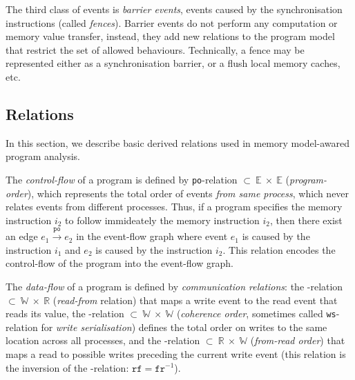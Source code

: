 The third class of events is \textit{barrier events}, events caused by the synchronisation instructions (called \textit{fences}). Barrier events do not perform any computation or memory value transfer, instead, they add new relations to the program model that restrict the set of allowed behaviours. Technically, a fence may be represented either as a synchronisation barrier, or a flush local memory caches, etc.


\subsection{Relations}
\label{ch:wmm:model:relations}

In this section, we describe basic derived relations used in memory model-awared program analysis.

The \textit{control-flow} of a program is defined by \texttt{po}-relation $\subset~\mathbb{E}~\times~\mathbb{E}$ (\textit{program-order}), which represents the total order of events \textit{from same process}, which never relates events from different processes.
Thus, if a program specifies the memory instruction $i_2$ to follow immideately the memory instruction $i_2$, then there exist an edge $e_1 \xrightarrow{\mathtt{po}} e_2$ in the event-flow graph where event $e_1$ is caused by the instruction $i_1$ and $e_2$ is caused by the instruction $i_2$. This relation encodes the control-flow of the program into the event-flow graph.

The \textit{data-flow} of a program is defined by \textit{communication relations}: the \rf-relation $\subset~\mathbb{W}~\times~\mathbb{R}$ (\textit{read-from} relation) that maps a write event to the read event that reads its value, the \co-relation $\subset~\mathbb{W}~\times~\mathbb{W}$ (\textit{coherence order}, sometimes called \texttt{ws}-relation for \textit{write serialisation}) defines the total order on writes to the same location across all processes, and the \fr-relation $\subset~\mathbb{R}~\times~\mathbb{W}$ (\textit{from-read order}) that maps a read to possible writes preceding the current write event (this relation is the inversion of the \rf-relation: $\mathtt{rf} = \mathtt{fr}^{-1}$).

